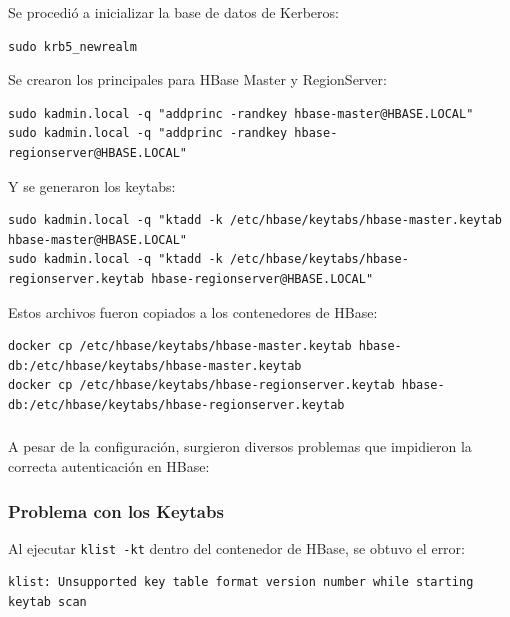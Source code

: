 \documentclass{article}
\begin{document}
Se procedió a inicializar la base de datos de Kerberos:

\begin{lstlisting}[style=bashStyle]
sudo krb5_newrealm
\end{lstlisting}

\newpage
Se crearon los principales para HBase Master y RegionServer:

\begin{lstlisting}[style=bashStyle]
sudo kadmin.local -q "addprinc -randkey hbase-master@HBASE.LOCAL"
sudo kadmin.local -q "addprinc -randkey hbase-regionserver@HBASE.LOCAL"
\end{lstlisting}


Y se generaron los keytabs:

\begin{lstlisting}[style=bashStyle]
sudo kadmin.local -q "ktadd -k /etc/hbase/keytabs/hbase-master.keytab hbase-master@HBASE.LOCAL"
sudo kadmin.local -q "ktadd -k /etc/hbase/keytabs/hbase-regionserver.keytab hbase-regionserver@HBASE.LOCAL"
\end{lstlisting}

Estos archivos fueron copiados a los contenedores de HBase:

\begin{lstlisting}[style=bashStyle]
docker cp /etc/hbase/keytabs/hbase-master.keytab hbase-db:/etc/hbase/keytabs/hbase-master.keytab
docker cp /etc/hbase/keytabs/hbase-regionserver.keytab hbase-db:/etc/hbase/keytabs/hbase-regionserver.keytab
\end{lstlisting}

\subsubsection{}
A pesar de la configuración, surgieron diversos problemas que impidieron la correcta autenticación en HBase:

\vspace{5mm}

\subsubsection{Problema con los Keytabs}

Al ejecutar \texttt{klist -kt} dentro del contenedor de HBase, se obtuvo el error:

\begin{lstlisting}[style=bashStyle]
klist: Unsupported key table format version number while starting keytab scan
\end{lstlisting}
\end{document}
